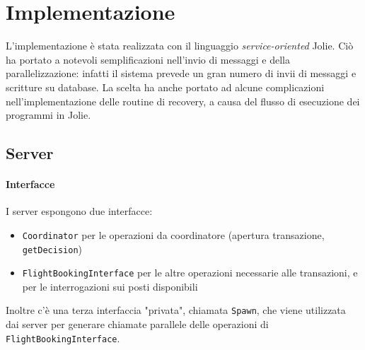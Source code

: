 \documentclass[a4paper]{article}
\begin{document}

\section{Implementazione}

L'implementazione è stata realizzata con il linguaggio \textit{service-oriented} Jolie. Ciò ha portato a notevoli semplificazioni nell'invio di messaggi e della parallelizzazione: infatti il sistema prevede un gran numero di invii di messaggi e scritture su database. La scelta ha anche portato ad alcune complicazioni nell'implementazione delle routine di recovery, a causa del flusso di esecuzione dei programmi in Jolie.

\subsection{Server}
\paragraph{Interfacce}I server espongono due interfacce:
\begin{itemize}
	\item \texttt{Coordinator} per le operazioni da coordinatore (apertura transazione, \texttt{getDecision})
	\item \texttt{FlightBookingInterface} per le altre operazioni necessarie alle transazioni, e per le interrogazioni sui posti disponibili
\end{itemize}
Inoltre c'è una terza interfaccia "privata", chiamata \texttt{Spawn}, che viene utilizzata dai server per generare chiamate parallele delle operazioni di \texttt{FlightBookingInterface}.
\end{document}
